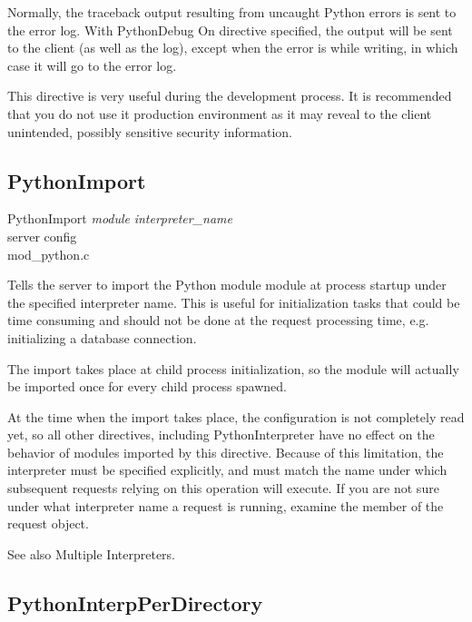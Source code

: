 Normally, the traceback output resulting from uncaught Python errors
is sent to the error log. With PythonDebug On directive specified, the
output will be sent to the client (as well as the log), except when
the error is  while writing, in which case it will go
to the error log.

This directive is very useful during the development process. It is
recommended that you do not use it production environment as it may
reveal to the client unintended, possibly sensitive security
information.

\subsection{PythonImport\label{dir-other-pimp}}

PythonImport \emph{module} \emph{interpreter_name}\\
server config\\
mod_python.c

Tells the server to import the Python module module at process startup
under the specified interpreter name. This is useful for
initialization tasks that could be time consuming and should not be
done at the request processing time, e.g. initializing a database
connection.

The import takes place at child process initialization, so the module
will actually be imported once for every child process spawned.

\begin{notice}
  At the time when the import takes place, the configuration is not
  completely read yet, so all other directives, including
  PythonInterpreter have no effect on the behavior of modules imported
  by this directive. Because of this limitation, the interpreter must
  be specified explicitly, and must match the name under which
  subsequent requests relying on this operation will execute. If you
  are not sure under what interpreter name a request is running,
  examine the  member of the request object.
\end{notice}

See also Multiple Interpreters. 

\subsection{PythonInterpPerDirectory\label{dir-other-ipd}}


